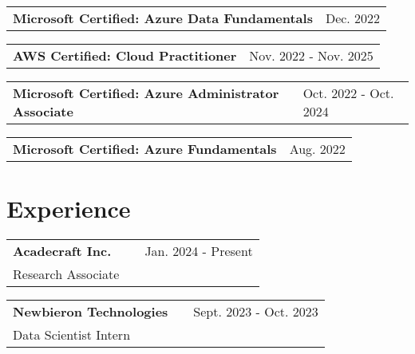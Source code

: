 \documentclass[a4paper,8pt]{article}
\begin{document}
\begin{tabularx}{\linewidth}{ @{} l X @{} }
\color[HTML]{1C033C} \textbf{Microsoft Certified: Azure Data Fundamentals} & \hfill \color[HTML]{371e77} Dec. 2022 \\[4pt]
\end{tabularx}

\begin{tabularx}{\linewidth}{ @{} l X @{} }
\color[HTML]{1C033C} \textbf{AWS Certified: Cloud Practitioner} & \hfill \color[HTML]{371e77} Nov. 2022 - Nov. 2025 \\[4pt]
\end{tabularx}

\begin{tabularx}{\linewidth}{ @{} l X @{} }
\color[HTML]{1C033C} \textbf{Microsoft Certified: Azure Administrator Associate} & \hfill \color[HTML]{371e77} Oct. 2022 - Oct. 2024 \\[4pt]
\end{tabularx}

\begin{tabularx}{\linewidth}{ @{} l X @{} }
\color[HTML]{1C033C} \textbf{Microsoft Certified: Azure Fundamentals} & \hfill \color[HTML]{371e77} Aug. 2022 \\[4pt]
\end{tabularx}

\section{Experience}

\begin{tabularx}{\linewidth}{ @{} l X r @{} }
\color[HTML]{1C033C} \textbf{Acadecraft Inc.} & & \color[HTML]{371e77} Jan. 2024 - Present \\
Research Associate
\end{tabularx}

\begin{tabularx}{\linewidth}{ @{} l X r @{} }
\color[HTML]{1C033C} \textbf{Newbieron Technologies} & & \color[HTML]{371e77} Sept. 2023 - Oct. 2023 \\
Data Scientist Intern
\end{tabularx}

\end{document}
